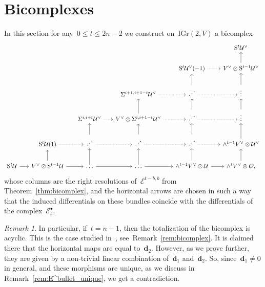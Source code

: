 \documentclass[a4paper]{article}
\newcommand{\IGr}{\mathrm{IGr}}
\newcommand{\cE}{\mathcal{E}}
\newcommand{\cU}{\mathcal{U}}
\newcommand{\Sy}{\mathrm{S}}
\newcommand{\cO}{\mathcal{O}}
\newcommand{\vn}{\mathbf{d}}
\theoremstyle{remark}
\newtheorem{remark}[theorem]{Remark}
\theoremstyle{definition}
\begin{document}
\section{Bicomplexes}\label{sec:correct_maps}

In this section for any~\(0 \le t \le 2n-2\) we construct on~\(\IGr(2, V)\) a bicomplex
\begin{equation}
\label{eq:bicomplex}
\begin{tikzcd}[column sep = 15pt]
&&&&& \mathrm{S}^{t} \cU^\vee\\
&&&& \Sy^{t}\cU^\vee(-1) \rar[dotted] & V^\vee \otimes \Sy^{t-1} \cU^\vee \uar\\
&&& \Sigma^{i+1, i+1-t} \cU^\vee \rar[dotted] & \reflectbox{\(\ddots\)} \uar \rar[dotted] &  \vdots \uar \\
&& \Sigma^{i, i+t} \cU^\vee \rar[dotted] &V^\vee \otimes \Sigma^{i, i+1-t} \cU^\vee \uar \rar[dotted] & \reflectbox{\(\ddots\)} \uar \rar[dotted] &\vdots \uar \\
& \Sy^{t}\cU(1) \rar[dotted] & \reflectbox{\(\ddots\)}\uar \rar[dotted]&\reflectbox{\(\ddots\)} \uar \rar[dotted]&\reflectbox{\(\ddots\)} \rar[dotted] \uar &\wedge^{t-1} V^\vee \otimes \cU^\vee\uar\\
\Sy^{t} \cU \rar& V^\vee \otimes \Sy^{t-1} \cU  \uar \rar &\dots \rar \uar & \dots \rar \uar &\wedge^{t-1} V^\vee \otimes \cU \rar \uar & \wedge^{t} V^\vee \otimes \cO, \uar 
\end{tikzcd}
\end{equation}
whose columns are the right resolutions of~\(\cE^{t-b,b}\) from Theorem~\ref{thm:bicomplex},
and the horizontal arrows are chosen in such a way 
that the induced differentials on these bundles coincide with the differentials of the complex~\(\cE_{t}^\bullet\).
\begin{remark}\label{rem:bicomplex2}
	In particular, if~\(t = n-1\), then the totalization of the bicomplex is acyclic. This is the case studied in~\cite[Proposition~5.3]{lines}, see~Remark~\ref{rem:bicomplex}. It is claimed there that the horizontal maps are equal to~\(\vn_2\). However, as we prove further, they are given by a non-trivial linear combination of~\(\vn_1\) and~\(\vn_2\). So, since~\(\vn_1 \neq 0\) in general, and these morphisms are unique, as we discuss in Remark~\ref{rem:E^bullet_unique}, we get a contradiction.
\end{remark}
\end{document}
